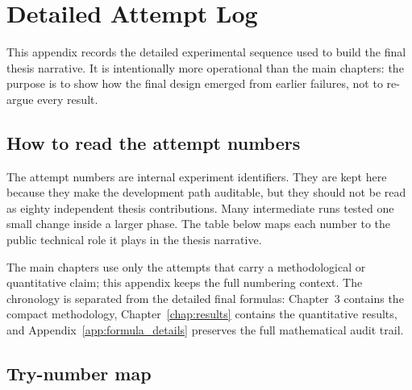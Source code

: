\chapter{Detailed Attempt Log}

This appendix records the detailed experimental sequence used to build the
final thesis narrative. It is intentionally more operational than the main
chapters: the purpose is to show how the final design emerged from earlier
failures, not to re-argue every result.

\section{How to read the attempt numbers}

The attempt numbers are internal experiment identifiers. They are kept here
because they make the development path auditable, but they should not be read
as eighty independent thesis contributions. Many intermediate runs tested one
small change inside a larger phase. The table below maps each number to the
public technical role it plays in the thesis narrative.

The main chapters use only the attempts that carry a methodological or
quantitative claim; this appendix keeps the full numbering context. The
chronology is separated from the detailed final formulas: Chapter~3 contains
the compact methodology, Chapter~\ref{chap:results} contains the quantitative
results, and Appendix~\ref{app:formula_details} preserves the full mathematical
audit trail.

\section{Try-number map}

